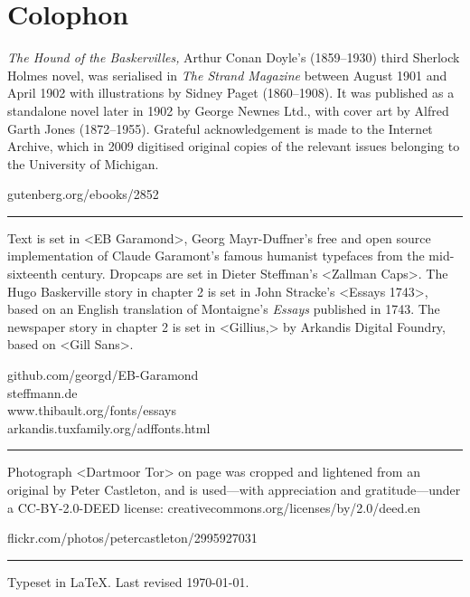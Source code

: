 \documentclass[
a5paper,
]{scrbook} %
\begin{document}
\renewcommand*{\chapterheadstartvskip}{\vspace{0cm}}
\renewcommand*{\chapterheadendvskip}{\vspace{1em}}
\chapter*{Colophon}
\centering
\vfill
\begin{minipage}{\textwidth}
\textit{The Hound of the Baskervilles,} Arthur Conan Doyle's (1859--1930) third Sherlock Holmes novel, was serialised in \textit{The Strand Magazine} between August 1901 and April 1902 with illustrations by Sidney Paget (1860--1908). It was published as a standalone novel later in 1902 by George Newnes Ltd., with cover art by Alfred Garth Jones (1872--1955). Grateful acknowledgement is made to the Internet Archive, which in 2009 digitised original copies of the relevant issues belonging to the University of Michigan. 
\end{minipage}
\vfill
gutenberg.org/ebooks/2852
\vfill
\rule{0.5\textwidth}{.4pt}
\vfill
\begin{minipage}{\textwidth}
Text is set in <EB Garamond>, Georg Mayr-Duffner's free and open source implementation of Claude Garamont’s famous humanist typefaces from the mid-sixteenth century. Dropcaps are set in Dieter Steffman's <Zallman Caps>. The Hugo Baskerville story in chapter 2 is set in John Stracke's <Essays 1743>, based on an English translation of Montaigne's \textit{Essays} published in 1743. The newspaper story in chapter 2 is set in <Gillius,> by Arkandis Digital Foundry, based on <Gill Sans>.
\end{minipage}
\vfill
github.com/georgd/EB-Garamond\\
steffmann.de\\
www.thibault.org/fonts/essays\\
arkandis.tuxfamily.org/adffonts.html
\vfill
\rule{0.5\textwidth}{.4pt}
\vfill
\begin{minipage}{\textwidth}
Photograph <Dartmoor Tor> on page \pageref{tor} was cropped and lightened from an original by Peter Castleton, and is used—with appreciation and gratitude—under a CC-BY-2.0-DEED license: creativecommons.org/licenses/by/2.0/deed.en
\end{minipage}
\vfill
flickr.com/photos/petercastleton/2995927031
\vfill
\rule{0.5\textwidth}{.4pt}
\vfill
Typeset in \LaTeX{}. Last revised \today.
\thispagestyle{empty}
\end{document}
